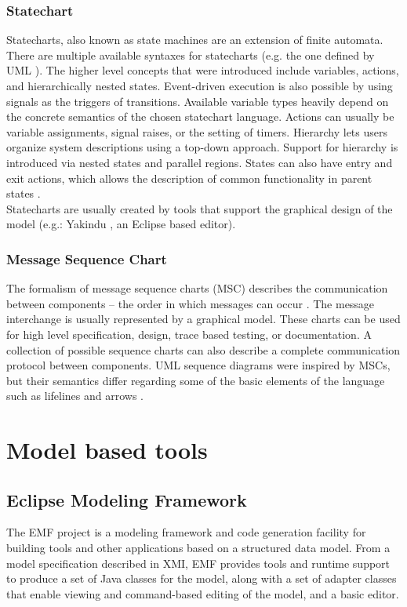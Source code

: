 \subsubsection{Statechart}

Statecharts, also known as state machines are an extension of finite automata. There are multiple available syntaxes for statecharts (e.g. the one defined by UML \citep{stcuml}). The higher level concepts that were introduced include variables, actions, and hierarchically nested states. Event-driven execution is also possible by using signals as the triggers of transitions. Available variable types heavily depend on the concrete semantics of the chosen statechart language. Actions can usually be variable assignments, signal raises, or the setting of timers. Hierarchy lets users organize system descriptions using a top-down approach. Support for hierarchy is introduced via nested states and parallel regions. States can also have entry and exit actions, which allows the description of common functionality in parent states \citep{stcmove}.\\
Statecharts are usually created by tools that support the graphical design of the model (e.g.: Yakindu \citep{yakinduu}, an Eclipse based editor).

\subsubsection{Message Sequence Chart}

The formalism of message sequence charts (MSC) describes the communication between components -- the order in which messages can occur \citep{msc} \citep{msc2}. The message interchange is usually represented by a graphical model. These charts can be used for high level specification, design, trace based testing, or documentation. A collection of possible sequence charts can also describe a complete communication protocol between components. UML sequence diagrams were inspired by MSCs, but their semantics differ regarding some of the basic elements of the language such as lifelines and arrows \citep{mscuml}.

\section{Model based tools}

\subsection{Eclipse Modeling Framework}
The EMF project is a modeling framework and code generation facility for building tools and other applications based on a structured data model. From a model specification described in XMI, EMF provides tools and runtime support to produce a set of Java classes for the model, along with a set of adapter classes that enable viewing and command-based editing of the model, and a basic editor. \cite{EMF}

